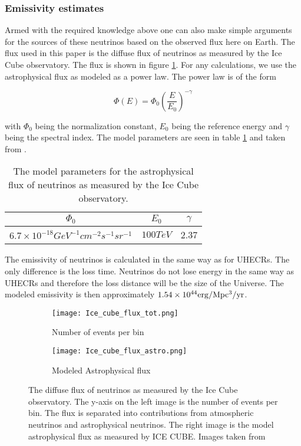 \subsubsection{Emissivity estimates}
\label{sec:emmisivity_neutrinos}

Armed with the required knowledge above one can also make simple arguments for the sources of these neutrinos based on the observed 
flux here on Earth. The flux used in this paper is the diffuse flux of neutrinos as measured by the Ice Cube observatory. The flux is shown in figure \ref{fig:flux_neutrinos}. 
For any calculations, we use the astrophysical flux as modeled as a power law. The power law is of the form 

\begin{equation}
    \Phi(E) = \Phi_0 \left(\frac{E}{E_0}\right)^{-\gamma}
\end{equation}

with $\Phi_0$ being the normalization constant, $E_0$ being the reference energy and $\gamma$ being the spectral index. The model parameters are seen in table \ref{tab:neutrino_flux} and taken from \cite{Abbasi_2022}.

\begin{table}
    \centering
    \begin{tabular}{|c|c|c|}
        \hline
        $\Phi_0$ & $E_0$ & $\gamma$ \\
        \hline
        $6.7\times 10^{-18} GeV^{-1} cm^{-2} s^{-1} sr^{-1}$ & $100 TeV$ & 2.37 \\
        \hline
    \end{tabular}
    \caption{The model parameters for the astrophysical flux of neutrinos as measured by the Ice Cube observatory.}
    \label{tab:neutrino_flux}
\end{table}

The emissivity of neutrinos is calculated in the same way as for UHECRs. The only difference is the loss time. Neutrinos do not lose energy in the same way as UHECRs and therefore the loss distance will be the size of the Universe. 
The modeled emissivity is then approximately $1.54 \times 10^{44} \rm erg/Mpc^3/yr$. 

\begin{figure}
    \centering
    \begin{subfigure}[b]{0.35\textwidth}
        \centering
        \texttt{[image: Ice\_cube\_flux\_tot.png]}
        \caption{Number of events per bin}
    \end{subfigure}%
    \begin{subfigure}[b]{0.5\textwidth}
        \centering
        \texttt{[image: Ice\_cube\_flux\_astro.png]}
        \caption{Modeled Astrophysical flux}
    \end{subfigure}
    \caption{The diffuse flux of neutrinos as measured by the Ice Cube observatory. The y-axis on the left image is the number of events per bin.  The flux is separated into contributions from atmospheric neutrinos and astrophysical neutrinos. The right image is the model astrophysical flux as measured by ICE CUBE. Images taken from \cite{Abbasi_2022} }
    \label{fig:flux_neutrinos}
\end{figure}


